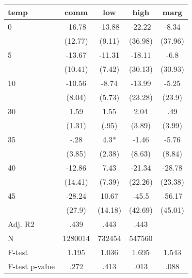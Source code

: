 \documentclass[]{article}
\begin{document}
\begin{tabular}{lcccc} \hline
temp & comm & low & high & marg \\ \hline
0 & -16.78 & -13.88 & -22.22 & -8.34 \\
 & (12.77) & (9.11) & (36.98) & (37.96) \\
5 & -13.67 & -11.31 & -18.11 & -6.8 \\
 & (10.41) & (7.42) & (30.13) & (30.93) \\
10 & -10.56 & -8.74 & -13.99 & -5.25 \\
 & (8.04) & (5.73) & (23.28) & (23.9) \\
30 & 1.59 & 1.55 & 2.04 & .49 \\
 & (1.31) & (.95) & (3.89) & (3.99) \\
35 & -.28 & 4.3* & -1.46 & -5.76 \\
 & (3.85) & (2.38) & (8.63) & (8.84) \\
40 & -12.86 & 7.43 & -21.34 & -28.78 \\
 & (14.41) & (7.39) & (22.26) & (23.38) \\
45 & -28.24 & 10.67 & -45.5 & -56.17 \\
 & (27.9) & (14.18) & (42.69) & (45.01) \\
\hline Adj. R2 & .439 & .443 & .443 &  \\
N & 1280014 & 732454 & 547560 &  \\
F-test & 1.195 & 1.036 & 1.695 & 1.543 \\
 F-test p-value & .272 & .413 & .013 & .088 \\ \hline
\end{tabular}
\end{document}
